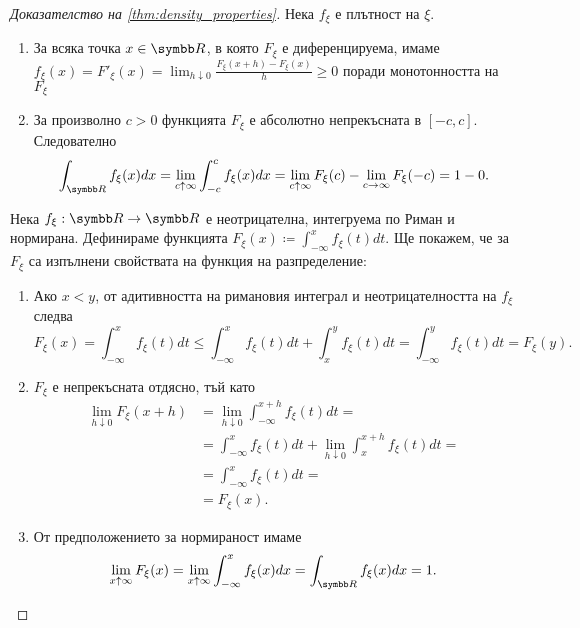 \documentclass[
  headings=standardclasses,
  bibliography=totocnumbered,
]{scrartcl}
\begin{document}
\begin{proof}[Доказателство на \cref{thm:density_properties}]
  \Sufficiency Нека \( f_\xi \) е плътност на \( \xi \).
  \begin{enumerate}
    \item За всяка точка \( x \in \R \), в която \( F_\xi \) е диференцируема, имаме \( f_\xi(x) = F'_\xi(x) = \lim_{h \downarrow 0} \frac {F_\xi(x + h) - F_\xi(x)} h \geq 0 \) поради монотонността на \( F_\xi \)
    \item За произволно \( c > 0 \) функцията \( F_\xi \) е абсолютно непрекъсната в \( [-c, c] \). Следователно
    \begin{equation*}
      \int_{\R} f_\xi(x) dx
      =
      \lim_{c \uparrow \infty} \int_{-c}^c f_\xi(x) dx
      =
      \lim_{c \uparrow \infty} F_\xi(c) - \lim_{c \to \infty} F_\xi(-c)
      =
      1 - 0.
    \end{equation*}
  \end{enumerate}

  \Necessity Нека \( f_\xi: \R \to \R \) е неотрицателна, интегруема по Риман и нормирана. Дефинираме функцията \( F_\xi(x) \coloneqq \int_{-\infty}^x f_\xi(t) dt \). Ще покажем, че за \( F_\xi \) са изпълнени свойствата на функция на разпределение:
  \begin{enumerate}
    \item Ако \( x < y \), от адитивността на римановия интеграл и неотрицателността на \( f_\xi \) следва
    \begin{equation*}
      F_\xi(x)
      =
      \int_{-\infty}^x f_\xi(t) dt
      \leq
      \int_{-\infty}^x f_\xi(t) dt + \int_x^y f_\xi(t) dt
      =
      \int_{-\infty}^y f_\xi(t) dt
      =
      F_\xi(y).
    \end{equation*}

    \item \( F_\xi \) е непрекъсната отдясно, тъй като
    \begin{align*}
      \lim_{h \downarrow 0} F_\xi(x + h)
      &=
      \lim_{h \downarrow 0} \int_{-\infty}^{x + h} f_\xi(t) dt
      = \\ &=
      \int_{-\infty}^x f_\xi(t) dt + \lim_{h \downarrow 0} \int_x^{x + h} f_\xi(t) dt
      = \\ &=
      \int_{-\infty}^x f_\xi(t) dt
      = \\ &=
      F_\xi(x).
    \end{align*}

    \item От предположението за нормираност имаме
    \begin{equation*}
      \lim_{x \uparrow \infty} F_\xi(x)
      =
      \lim_{x \uparrow \infty} \int_{-\infty}^x f_\xi(x) dx
      =
      \int_{\R} f_\xi(x) dx = 1.
    \end{equation*}


\end{enumerate}
\end{proof}
\end{document}
